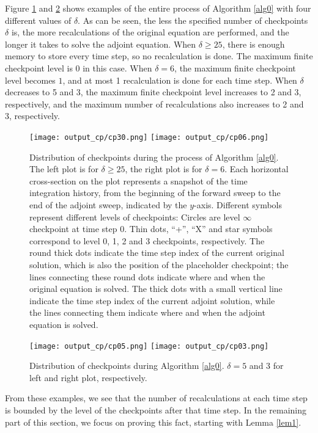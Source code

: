 Figure \ref{bigfig1} and \ref{bigfig2} shows examples of the entire process
of Algorithm \ref{alg0} with four different values of $\delta$.  As can be
seen, the less the specified number of checkpoints $\delta$ is, the more
recalculations of the original equation are performed, and the longer it
takes to solve the adjoint equation.  When $\delta \ge 25$, there is enough
memory to store every time step, so no recalculation is done.  The maximum
finite checkpoint level is $0$ in this case.  When $\delta = 6$, the maximum
finite checkpoint level becomes $1$, and at most 1 recalculation is done for
each time step.  When $\delta$ decreases to 5 and 3, the maximum finite
checkpoint level increases to 2 and 3, respectively, and the maximum number
of recalculations also increases to 2 and 3, respectively.
\begin{figure}[htb!] \center
    \texttt{[image: output\_cp/cp30.png]}
    \texttt{[image: output\_cp/cp06.png]}
    \caption{Distribution of checkpoints during the process of Algorithm
    \ref{alg0}.  The left plot is for $\delta \ge 25$, the right plot is for
    $\delta = 6$.
    Each horizontal cross-section on the plot represents a
    snapshot of the time integration history, from the beginning of the
    forward sweep to the end of the adjoint sweep, indicated by the $y$-axis.
    Different symbols represent different levels of
    checkpoints:  Circles are level $\infty$ checkpoint at time step 0.
    Thin dots, ``+'', ``X'' and star symbols correspond to level 0, 1, 2 and 3
    checkpoints, respectively.  The round thick dots indicate the time step
    index of the current original solution, which is also the position of the
    placeholder checkpoint; the lines connecting these round dots indicate
    where and when the original equation is solved.  The thick dots with a
    small vertical line indicate the time step index of the current adjoint
    solution, while the lines connecting them indicate where and when the
    adjoint equation is solved.}
 \label{bigfig1}
\end{figure}
\begin{figure}[htb!] \center
    \texttt{[image: output\_cp/cp05.png]}
    \texttt{[image: output\_cp/cp03.png]}
    \caption{Distribution of checkpoints during Algorithm \ref{alg0}.
    $\delta = 5$ and 3 for left and right plot, respectively.}
\label{bigfig2} 
\end{figure}
From these examples, we see that the number of recalculations at each time
step is bounded
by the level of the checkpoints after that time step.  In the remaining part
of this section, we focus on proving this fact, starting with Lemma \ref{lem1}.

